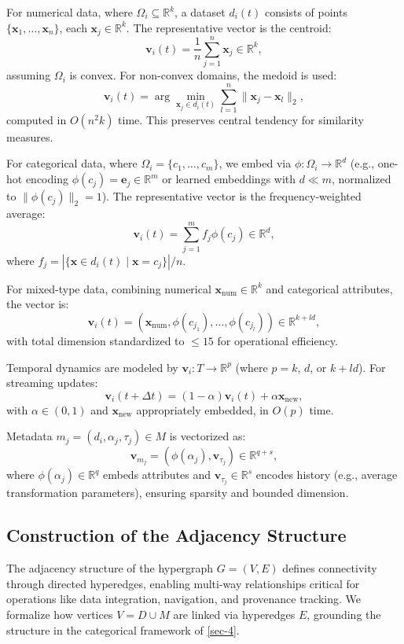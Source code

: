 \documentclass{amsart}
\newcommand\R{\mathbb R}
\newcommand\x{\mathbf x}
\newcommand\bv{\mathbf v}
\newcommand\e{\mathbf e}
\begin{document}
For numerical data, where \( \Omega_i \subseteq \R^k \), a dataset \( d_i(t) \) consists of points \( \{\x_1, \dots, \x_n\} \), each \( \x_j \in \R^k \). The representative vector is the centroid:
\[
\bv_i(t) = \frac{1}{n} \sum_{j=1}^n \x_j \in \R^k,
\]
assuming \( \Omega_i \) is convex. For non-convex domains, the medoid is used:
\[
\bv_i(t) = \arg\min_{\x_j \in d_i(t)} \sum_{l=1}^n \|\x_j - \x_l\|_2,
\]
computed in \( O(n^2 k) \) time. This preserves central tendency for similarity measures.

For categorical data, where \( \Omega_i = \{c_1, \dots, c_m\} \), we embed via \( \phi: \Omega_i \to \R^d \) (e.g., one-hot encoding \( \phi(c_j) = \e_j \in \R^m \) or learned embeddings with \( d \ll m \), normalized to \( \|\phi(c_j)\|_2 = 1 \)). The representative vector is the frequency-weighted average:
\[
\bv_i(t) = \sum_{j=1}^m f_j \phi(c_j) \in \R^d,
\]
where \( f_j = |\{ \x \in d_i(t) \mid \x = c_j \}| / n \).

For mixed-type data, combining numerical \( \x_{\text{num}} \in \R^k \) and categorical attributes, the vector is:
\[
\bv_i(t) = \left( \x_{\text{num}}, \phi(c_{j_1}), \dots, \phi(c_{j_l}) \right) \in \R^{k + l d},
\]
with total dimension standardized to \( \leq 15 \) for operational efficiency.

Temporal dynamics are modeled by \( \bv_i: T \to \R^p \) (where \( p = k \), \( d \), or \( k + l d \)). For streaming updates:
\[
\bv_i(t + \Delta t) = (1 - \alpha) \bv_i(t) + \alpha \x_{\text{new}},
\]
with \( \alpha \in (0,1) \) and \( \x_{\text{new}} \) appropriately embedded, in \( O(p) \) time.

Metadata \( m_j = (d_i, \alpha_j, \tau_j) \in M \) is vectorized as:
\[
\bv_{m_j} = (\phi(\alpha_j), \bv_{\tau_j}) \in \R^{q + s},
\]
where \( \phi(\alpha_j) \in \R^q \) embeds attributes and \( \bv_{\tau_j} \in \R^s \) encodes history (e.g., average transformation parameters), ensuring sparsity and bounded dimension.

\subsection{Construction of the Adjacency Structure} \label{subsec:adjacency_structure}

The adjacency structure of the hypergraph \( G = (V, E) \) defines connectivity through directed hyperedges, enabling multi-way relationships critical for operations like data integration, navigation, and provenance tracking. We formalize how vertices \( V = D \cup M \) are linked via hyperedges \( E \), grounding the structure in the categorical framework of \cref{sec-4}.
\end{document}
